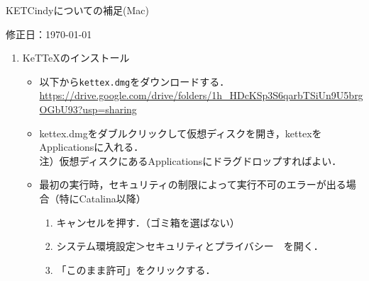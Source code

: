 \documentclass{ujarticle}
\begin{document}
\begin{center}
KETCindyについての補足(Mac)
\end{center}

\hfill 修正日：\today

\begin{enumerate}[\bf\large 1.]

\item KeTTeXのインストール

\begin{itemize}
\item 以下から\verb|kettex.dmg|をダウンロードする．\\
\hspace*{3mm}\url{https://drive.google.com/drive/folders/1h_HDcKSp3S6qarbTSiUn9U5brgOGbU93?usp=sharing}
\item kettex.dmgをダブルクリックして仮想ディスクを開き，kettexをApplicationsに入れる．\\
\hspace*{1zw}注）仮想ディスクにあるApplicationsにドラグドロップすればよい．
\item
最初の実行時，セキュリティの制限によって実行不可のエラーが出る場合（特にCatalina以降）
    \begin{enumerate}[(1)]
   \item キャンセルを押す．（ゴミ箱を選ばない）
   \item システム環境設定＞セキュリティとプライバシー　を開く．
   \item 「このまま許可」をクリックする．
   \end{enumerate}

\end{itemize}


\end{enumerate}
\end{document}
